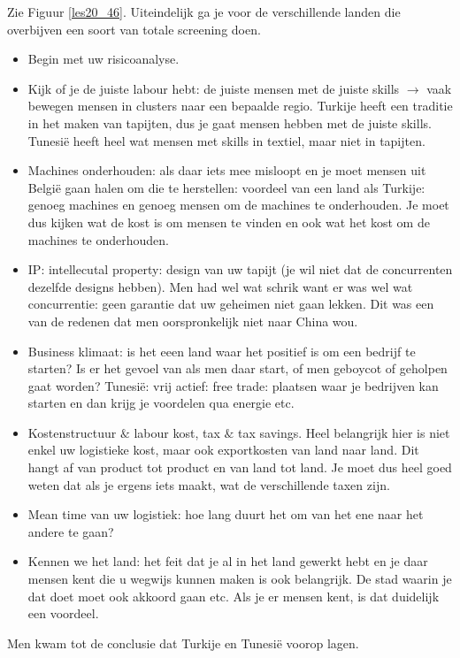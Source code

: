 \documentclass[10pt,a4paper]{report}
\begin{document}
Zie Figuur \ref{les20_46}. Uiteindelijk ga je voor de verschillende landen die overbijven een soort van totale screening doen. 
\begin{itemize}
\item Begin met uw risicoanalyse. 
\item Kijk of je de juiste labour hebt: de juiste mensen met de juiste skills $\rightarrow$ vaak bewegen mensen in clusters naar een bepaalde regio. Turkije heeft een traditie in het maken van tapijten, dus je gaat mensen hebben met de juiste skills. Tunesi\"e heeft heel wat mensen met skills in textiel, maar niet in tapijten.
\item Machines onderhouden: als daar iets mee misloopt en je moet mensen uit Belgi\"e gaan halen om die te herstellen: voordeel van een land als Turkije: genoeg machines en genoeg mensen om de machines te onderhouden. Je moet dus kijken wat de kost is om mensen te vinden en ook wat het kost om de machines te onderhouden.
\item IP: intellecutal property: design van uw tapijt (je wil niet dat de concurrenten dezelfde designs hebben). Men had wel wat schrik want er was wel wat concurrentie: geen garantie dat uw geheimen niet gaan lekken. Dit was een van de redenen dat men oorspronkelijk niet naar China wou.
\item Business klimaat: is het eeen land waar het positief is om een bedrijf te starten? Is er het gevoel van als men daar start, of men geboycot of geholpen gaat worden? Tunesi\"e: vrij actief: free trade: plaatsen waar je bedrijven kan starten en dan krijg je voordelen qua energie etc.
\item Kostenstructuur $\&$ labour kost, tax $\&$ tax savings. Heel belangrijk hier is niet enkel uw logistieke kost, maar ook exportkosten van land naar land. Dit hangt af van product tot product en van land tot land. Je moet dus heel goed weten dat als je ergens iets maakt, wat de verschillende taxen zijn. 
\item Mean time van uw logistiek: hoe lang duurt het om van het ene naar het andere te gaan?
\item Kennen we het land: het feit dat je al in het land gewerkt hebt en je daar mensen kent die u wegwijs kunnen maken is ook belangrijk. De stad waarin je dat doet moet ook akkoord gaan etc. Als je er mensen kent, is dat duidelijk een voordeel.
\end{itemize}

Men kwam tot de conclusie dat Turkije en Tunesi\"e voorop lagen. 
\end{document}
